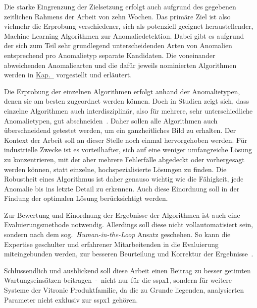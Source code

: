 Die starke Eingrenzung der Zielsetzung erfolgt auch aufgrund des gegebenen zeitlichen Rahmens der Arbeit von zehn Wochen. Das primäre
Ziel ist also vielmehr die Erprobung verschiedener, sich als potenziell geeignet heraustellender, Machine Learning Algorithmen zur
Anomaliedetektion. Dabei gibt es aufgrund der sich zum Teil sehr grundlegend unterscheidenden Arten von Anomalien entsprechend pro
Anomalietyp separate Kandidaten. Die voneinander abweichenden Anomaliearten und die dafür jeweils nominierten Algorithmen werden in
\hyperref[ch:anomalien]{Kap.~} vorgestellt und erläutert.

Die Erprobung der einzelnen Algorithmen erfolgt anhand der Anomalietypen, denen sie am besten zugeordnet werden können. Doch in
Studien zeigt sich, dass einzelne Algorithmen auch interdisziplinär, also für mehrere, sehr unterschiedliche Anomalietypen, gut
abschneiden~\cite[S.~30~-~31]{Wenig2024}\cite{Schmidl2022}. Daher sollen alle Algorithmen auch überschneidend getestet werden, um ein ganzheitliches Bild zu erhalten.
Der Kontext der Arbeit soll an dieser Stelle noch einmal hervorgehoben werden. Für industrielle Zwecke ist es vorteilhafter, sich auf eine
weniger umfangreiche Lösung zu konzentrieren, mit der aber mehrere Fehlerfälle abgedeckt oder vorhergesagt werden können, statt einzelne,
hochspezialisierte Lösungen zu finden. Die Robustheit eines Algorithmus ist daher genauso wichtig wie die Fähigkeit, jede Anomalie bis
ins letzte Detail zu erkennen. Auch diese Einordnung soll in der Findung der optimalen Lösung berücksichtigt werden.

Zur Bewertung und Einordnung der Ergebnisse der Algorithmen ist auch eine Evaluierungsmethode notwendig. Allerdings soll diese nicht
vollautomatisiert sein, sondern nach dem sog.~\textit{Human-in-the-Loop} Ansatz geschehen. So kann die Expertise geschulter und
erfahrener Mitarbeitenden in die Evaluierung miteingebunden werden, zur besseren Beurteilung und Korrektur der Ergebnisse~\cite{Deng2024}.

Schlussendlich und ausblickend soll diese Arbeit einen Beitrag zu besser getimten Wartungseinsätzen beitragen~-~nicht nur für die \ac{sspx1},
sondern für weitere Systeme der Vitronic Produktfamilie, da die zu Grunde liegenden, analysierten Parameter nicht exklusiv zur \ac{sspx1} gehören.